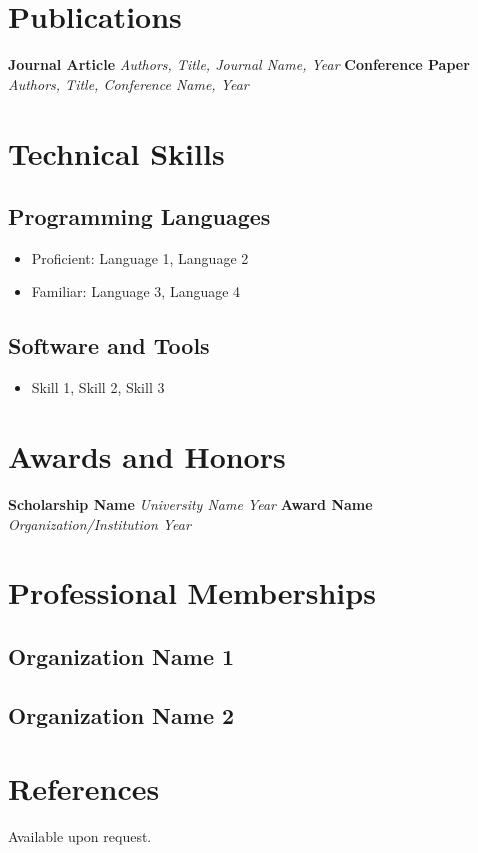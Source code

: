 \documentclass[a4paper,12pt]{article}
\newcommand{\cvsection}[1]{\section*{#1}}
\newcommand{\cvsubsection}[1]{\subsection*{#1}}
\newcommand{\cvitem}[2]{\textbf{#1} \hfill \textit{#2}}
\begin{document}
\cvsection{Publications}
\cvitem{Journal Article}{Authors, \textit{Title}, Journal Name, Year}
\cvitem{Conference Paper}{Authors, \textit{Title}, Conference Name, Year}

\cvsection{Technical Skills}
\cvsubsection{Programming Languages}
\begin{itemize}[leftmargin=*, itemsep=0pt]
    \item Proficient: Language 1, Language 2
    \item Familiar: Language 3, Language 4
\end{itemize}

\cvsubsection{Software and Tools}
\begin{itemize}[leftmargin=*, itemsep=0pt]
    \item Skill 1, Skill 2, Skill 3
\end{itemize}

\cvsection{Awards and Honors}
\cvitem{Scholarship Name}{University Name \hfill Year}
\cvitem{Award Name}{Organization/Institution \hfill Year}

\cvsection{Professional Memberships}
\cvsubsection{Organization Name 1}
\cvsubsection{Organization Name 2}

\cvsection{References}
Available upon request.
\end{document}
